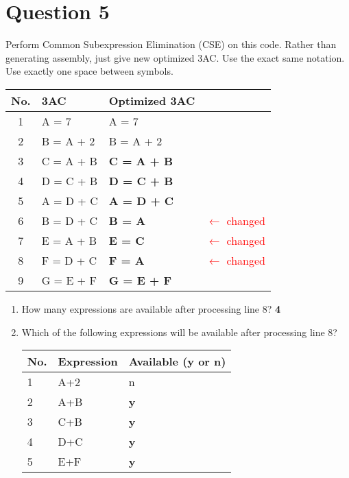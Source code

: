 \documentclass{article}
\newcommand{\textr}[1]{\textcolor{red}{#1}}
\begin{document}
\section*{Question 5}
Perform Common Subexpression Elimination (CSE) on this code. Rather than generating assembly, just give new optimized 3AC. Use the exact same notation. Use exactly one space between symbols.
\vspace{-1em}
\begin{multicols}{2}
\begin{tabular}{|c|l|l|l}
  \hline
  \textbf{No.} & \textbf{3AC} & \textbf{Optimized 3AC} \\
  \hline
  1   & A = 7       & A = 7 \\
  \hline
  2   & B = A + 2   & B = A + 2 \\
  \hline
  3   & C = A + B   & \textbf{C = A + B} \\
  \hline
  4   & D = C + B   & \textbf{D = C + B} \\
  \hline
  5   & A = D + C   & \textbf{A = D + C} \\
  \hline
  6   & B = D + C   & \textbf{B = A} & \textr{$\leftarrow$ changed} \\
  \hline
  7   & E = A + B   & \textbf{E = C} & \textr{$\leftarrow$ changed} \\
  \hline
  8   & F = D + C   & \textbf{F = A} & \textr{$\leftarrow$ changed} \\
  \hline
  9   & G = E + F   & \textbf{G = E + F} \\
  \hline
\end{tabular}
\begin{enumerate}
  \item How many expressions are available after processing line 8? \textbf{4} \\
  \item Which of the following expressions will be available after processing line 8?
  \begin{tabular}{|l|l|l|}
  \hline
  \textbf{No.} & \textbf{Expression} & \textbf{Available (y or n)} \\
  \hline
  1 & A+2 & n \\
  \hline
  2 & A+B & \textbf{y} \\
  \hline
  3 & C+B & \textbf{y} \\
  \hline
  4 & D+C & \textbf{y} \\
  \hline
  5 & E+F & \textbf{y} \\
  \hline
  \end{tabular}
\end{enumerate}
\end{multicols}
\end{document}
